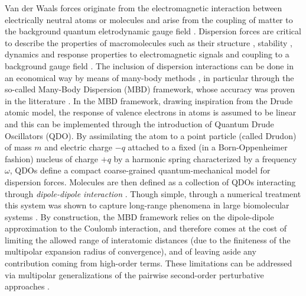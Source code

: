 \documentclass[reprint, amsmath, amssymb, floatfix, aps, pra]{revtex4-2}
\begin{document}
    Van der Waals forces originate from the electromagnetic interaction between electrically neutral atoms or molecules \cite{margenau2013theory,kaplan2006intermolecular,stone2013theory,hirschfelder2009intermolecular} and arise from the coupling of matter to the background quantum eletrodynamic gauge field \cite{casimir1948influence,buhmann2013dispersion,buhmann2007dispersion,compagno1995atom,passante2018dispersion, cohen1997photons,cohen1998atom,bookpreparata,salam2009molecular,craig1998t}. Dispersion forces are critical to describe the properties of macromolecules such as their structure \cite{hoja2019reliable}, stability \cite{hoja2018first,mortazavi2018structure}, dynamics \cite{stohr2019quantum,reilly2014role,galante2021anisotropic} and response properties to electromagnetic signals \cite{kleshchonok2018tailoring, ambrosetti2022optical} and coupling to a background gauge field \cite{Karimpour_2022, karimpour2021comprehensive}. The inclusion of dispersion interactions can be done in an economical way by means of many-body methods \cite{richardson1975dispersion,mahanty1973dispersion,woods2016materials,tkatchenko2015current,ren2012random,harl2009accurate,dobson2012calculation,parsegian2005van,becke2006simple,becke2006exchange,grimme2010consistent,grimme2006semiempirical,tkatchenko2012accurate,massa2021many}, in particular through the so-called Many-Body Dispersion (MBD) framework, whose accuracy was proven in the litterature \cite{tkatchenko2012accurate,ambrosetti2014long}. In the MBD framework, drawing inspiration from the Drude atomic model, the response of valence electrons in atoms is assumed to be linear and this can be implemented through the introduction of Quantum Drude Oscillators (QDO). By assimilating the atom to a point particle (called Drudon) of mass $m$ and electric charge $-q$ attached to a fixed (in a Born-Oppenheimer fashion) nucleus of charge $+q$ by a harmonic spring characterized by a frequency $\omega$, QDOs define a compact coarse-grained quantum-mechanical model for dispersion forces. Molecules are then defined as a collection of QDOs interacting through \textit{dipole-dipole interaction} \cite{doi:10.1063/1.1743992, doi:10.1063/1.1743991}. Though simple, through a numerical treatment this system was shown to capture long-range phenomena in large biomolecular systems \cite{https://doi.org/10.48550/arxiv.2205.11549}. By construction, the MBD framework relies on the dipole-dipole approximation to the Coulomb interaction, and therefore comes at the cost of limiting the allowed range of interatomic distances (due to the finiteness of the multipolar expansion radius of convergence), and of leaving aside any contribution coming from high-order terms. These limitations can be addressed via multipolar generalizations of the pairwise second-order perturbative approaches \cite{massa2021beyond,massa2021many,becke2006simple,becke2006exchange}.
\end{document}
